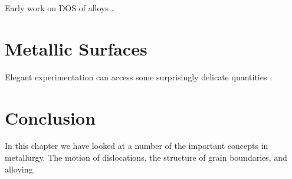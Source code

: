 Early work on DOS of alloys \cite{cubiotti77}. 

\section{Metallic Surfaces}

Elegant experimentation can access some surprisingly delicate quantities \cite{whipp34}.

\section{Conclusion}
In this chapter we have looked at a number of the important concepts
in metallurgy. The motion of dislocations, 
the structure of grain boundaries, and alloying. 


